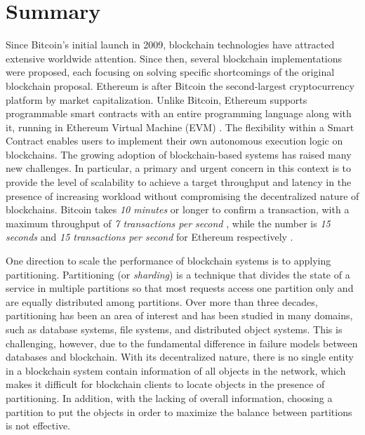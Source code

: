 \newpage
\section{Summary}
Since Bitcoin's initial launch in 2009, blockchain technologies have attracted
extensive worldwide attention. Since then, several blockchain implementations
were proposed, each focusing on solving specific shortcomings of the original
blockchain proposal. Ethereum is after Bitcoin the second-largest cryptocurrency
platform by market capitalization. Unlike Bitcoin, Ethereum supports programmable
smart contracts with an entire programming language along with it, running in
Ethereum Virtual Machine (EVM) \cite{ethereum:evm}. The flexibility within a
Smart Contract enables users to implement their own autonomous execution logic
on blockchains\cite{delmolino2016step, buterin2014next, kosba2016hawk}. The
growing adoption of blockchain-based systems has raised many new challenges. In
particular, a primary and urgent concern in this context is to provide the level
of scalability to achieve a target throughput and latency in the presence of
increasing workload without compromising the decentralized nature of
blockchains. Bitcoin takes \emph{10 minutes} or longer to confirm a transaction,
with a maximum throughput of \emph{7 transactions per second}
\cite{nakamoto2019bitcoin}, while the number is \emph{15 seconds} and \emph{15
transactions per second} for Ethereum respectively \cite{ethereum:sharding}. 

One direction to scale the performance of blockchain systems is to applying
partitioning. Partitioning (or \emph{sharding}) is a technique that divides the
state of a service in multiple partitions so that most requests access one
partition only and are equally distributed among partitions. Over more than
three decades, partitioning has been an area of interest and has been studied in
many domains, such as database systems, file systems, and distributed object
systems. This is challenging, however, due to the fundamental difference in
failure models between databases and blockchain. With its decentralized nature,
there is no single entity in a blockchain system contain information of all
objects in the network, which makes it difficult for blockchain clients to locate
objects in the presence of partitioning. In addition, with the lacking of overall
information, choosing a partition to put the objects in order to maximize the
balance between partitions is not effective. 

